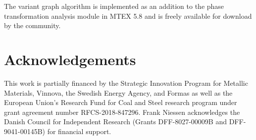 \documentclass{elsarticle}
\numberwithin{equation}{section}
\begin{document}
The variant graph algorithm is implemented as an addition to the phase transformation analysis module in MTEX 5.8 and is freely available for download by the community.



\section{Acknowledgements}
This work is partially financed by the Strategic Innovation Program for Metallic Materials, Vinnova, the Swedish Energy Agency, and Formas as well as the European Union’s Research Fund for Coal and Steel research program under grant agreement number RFCS-2018-847296. Frank Niessen acknowledges the Danish Council for Independent Research (Grants DFF-8027-00009B and DFF-9041-00145B) for financial support.


%

\end{document}
